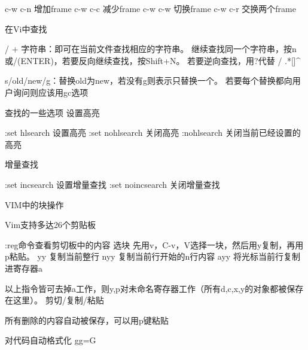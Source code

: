 
\begin{code}
c-w c-n 增加frame
c-w c-c 减少frame
c-w c-w 切换frame
c-w c-r 交换两个frame

在Vi中查找

/ + 字符串：即可在当前文件查找相应的字符串。
继续查找同一个字符串，按n或/(ENTER)，若要反向继续查找，按Shift+N。
若要逆向查找，用?代替 /
.*[]^%

s/old/new/g：替换old为new，若没有g则表示只替换一个。
若要每个替换都向用户询问则应该用gc选项

查找的一些选项
设置高亮

:set hlsearch    设置高亮
:set nohlsearch  关闭高亮
:nohlsearch      关闭当前已经设置的高亮

增量查找

:set incsearch   设置增量查找
:set noincsearch 关闭增量查找

VIM中的块操作
\end{code}

\begin{code}
Vim支持多达26个剪贴板

:reg命令查看剪切板中的内容
  选块   先用v，C-v，V选择一块，然后用y复制，再用p粘贴。
  yy     复制当前整行
  nyy    复制当前行开始的n行内容
  ayy    将光标当前行复制进寄存器a

以上指令皆可去掉a工作，则y,p对未命名寄存器工作（所有d,c,x,y的对象都被保存在这里）。
剪切/复制/粘贴

所有删除的内容自动被保存，可以用p键粘贴

对代码自动格式化 gg=G 
\end{code}

\newpage
